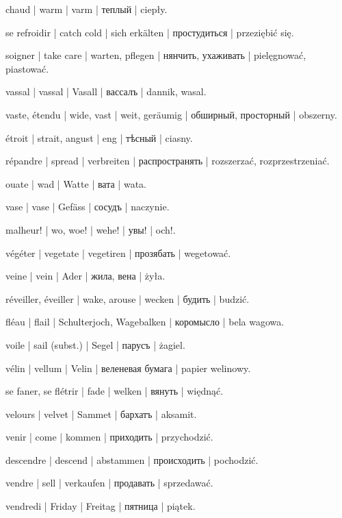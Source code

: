 \begin{outdent}{1em}
chaud | warm | varm | теплый | ciepły.

\uvsubentry{}
se refroidir | catch cold | sich erkälten | простудиться | przeziębić się.

soigner | take care | warten, pflegen | нянчить, ухаживать | pielęgnować, piastować.

vassal | vassal | Vasall | вассалъ | dannik, wasal.

vaste, étendu | wide, vast | weit, geräumig | обширный,
просторный | obszerny.

\uvsubentry{}
étroit | strait, angust | eng | тѣсный | ciasny.


\uvsubentry{}
répandre | spread | verbreiten | распространять | rozszerzać, rozprzestrzeniać.

ouate | wad | Watte | вата | wata.

vase | vase | Gefäss | сосудъ | naczynie.

malheur! | wo, woe! | wehe! | увы! | och!.

végéter | vegetate | vegetiren | прозябать | wegetować.

veine | vein | Ader | жила, вена | żyła.

réveiller, éveiller | wake, arouse | wecken | будить | budzić.

fléau | flail | Schulterjoch, Wagebalken | коромысло | bela wagowa.

voile | sail (subst.) | Segel | парусъ | żagiel.

vélin | vellum | Velin | веленевая бумага | papier welinowy.

se faner, se flétrir | fade | welken | вянуть | więdnąć.

velours | velvet | Sammet | бархатъ | aksamit.

venir | come | kommen | приходить | przychodzić.

\uvsubentry{}
descendre | descend | abstammen | происходить | pochodzić.

vendre | sell | verkaufen | продавать | sprzedawać.

vendredi | Friday | Freitag | пятница | piątek.


\end{outdent}

